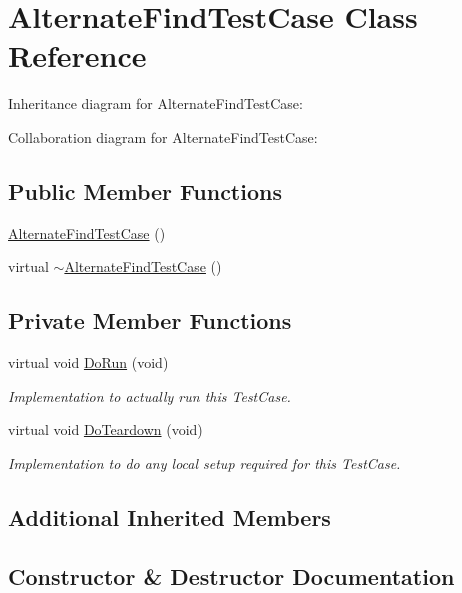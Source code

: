 \hypertarget{classAlternateFindTestCase}{}\section{Alternate\+Find\+Test\+Case Class Reference}
\label{classAlternateFindTestCase}


Inheritance diagram for Alternate\+Find\+Test\+Case\+:


Collaboration diagram for Alternate\+Find\+Test\+Case\+:
\subsection*{Public Member Functions}
\begin{DoxyCompactItemize}
\item 
\hyperlink{classAlternateFindTestCase_a150e17de537d88765efd166018ce3513}{Alternate\+Find\+Test\+Case} ()
\item 
virtual \hyperlink{classAlternateFindTestCase_aefe0fdbb48d480d3550b26985ebdcb19}{$\sim$\+Alternate\+Find\+Test\+Case} ()
\end{DoxyCompactItemize}
\subsection*{Private Member Functions}
\begin{DoxyCompactItemize}
\item 
virtual void \hyperlink{classAlternateFindTestCase_a5c6236a3b9b0e24a67e80f975015d539}{Do\+Run} (void)
\begin{DoxyCompactList}\small\item\em Implementation to actually run this Test\+Case. \end{DoxyCompactList}\item 
virtual void \hyperlink{classAlternateFindTestCase_af4c92992809e766ecfe22e639c2a58a4}{Do\+Teardown} (void)
\begin{DoxyCompactList}\small\item\em Implementation to do any local setup required for this Test\+Case. \end{DoxyCompactList}\end{DoxyCompactItemize}
\subsection*{Additional Inherited Members}


\subsection{Constructor \& Destructor Documentation}
